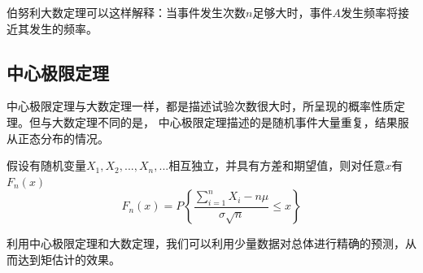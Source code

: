 \noindent
伯努利大数定理可以这样解释：当事件发生次数$n$足够大时，事件$A$发生频率将接近其发生的频率。

\subsection{中心极限定理}

中心极限定理与大数定理一样，都是描述试验次数很大时，所呈现的概率性质定理。但与大数定理不同的是，
中心极限定理描述的是随机事件大量重复，结果服从正态分布的情况。


假设有随机变量$X_1,X_2,...,X_n,...$相互独立，并具有方差和期望值，则对任意$x$有$F_n(x)$
\begin{equation*}
  F_{n}(x)=P\left\{\frac{\sum_{i=1}^{n} X_{i}-n \mu}{\sigma \sqrt{n}} \leq x\right\}
\end{equation*}

\noindent
利用中心极限定理和大数定理，我们可以利用少量数据对总体进行精确的预测，从而达到矩估计的效果。



